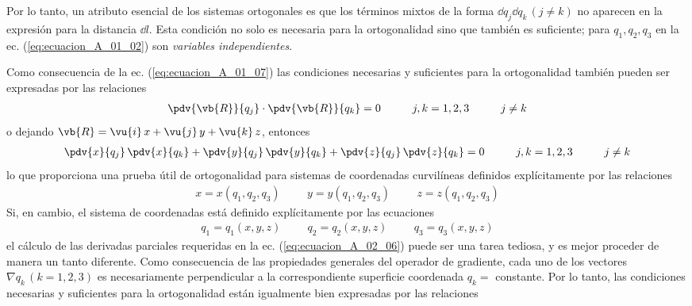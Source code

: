 Por lo tanto, un atributo esencial de los sistemas ortogonales es que los términos mixtos de la forma $\dd{q}_{j} \dd{q}_{k} \, (j \neq k)$ no aparecen en la expresión para la distancia $\dd{l}$. Esta condición no solo es necesaria para la ortogonalidad sino que también es suficiente; para $q_{1}, q_{2}, q_{3}$ en la ec. (\ref{eq:ecuacion_A_01_02}) son \emph{variables independientes}.
\par
Como consecuencia de la ec. (\ref{eq:ecuacion_A_01_07}) las condiciones necesarias y suficientes para la ortogonalidad también pueden ser expresadas por las relaciones
\begin{align}
\pdv{\vb{R}}{q_{j}} \cdot \pdv{\vb{R}}{q_{k}} = 0 \hspace{1cm} j, k = 1, 2, 3 \hspace{1cm} j \neq k
\label{eq:ecuacion_A_02_05}    
\end{align}
o dejando $\vb{R} = \vu{i} \, x + \vu{j} \, y + \vu{k} \, z$, entonces
\begin{align}
\pdv{x}{q_{j}} \, \pdv{x}{q_{k}} + \pdv{y}{q_{j}} \, \pdv{y}{q_{k}} + \pdv{z}{q_{j}} \, \pdv{z}{q_{k}} = 0 \hspace{1cm} j, k = 1, 2, 3 \hspace{1cm} j \neq k
\label{eq:ecuacion_A_02_06}
\end{align}
lo que proporciona una prueba útil de ortogonalidad para sistemas de coordenadas curvilíneas definidos explícitamente por las relaciones
\begin{align*}
x = x (q_{1}, q_{2}, q_{3}) \hspace{1cm} y = y (q_{1}, q_{2}, q_{3}) \hspace{1cm} z = z (q_{1}, q_{2}, q_{3})
\end{align*}
Si, en cambio, el sistema de coordenadas está definido explícitamente por las ecuaciones
\begin{align*}
q_{1} = q_{1} (x, y , z) \hspace{1cm} q_{2} = q_{2} (x, y , z) \hspace{1cm} q_{3} = q_{3} (x, y , z)
\end{align*}
el cálculo de las derivadas parciales requeridas en la ec. (\ref{eq:ecuacion_A_02_06}) puede ser una tarea tediosa, y es mejor proceder de manera un tanto diferente. Como consecuencia de las propiedades generales del operador de gradiente, cada uno de los vectores $\nabla q_{k} \, (k = 1,2,3)$ es necesariamente perpendicular a la correspondiente superficie coordenada $q_{k} =$ constante. Por lo tanto, las condiciones necesarias y suficientes para la ortogonalidad están igualmente bien expresadas por las relaciones
